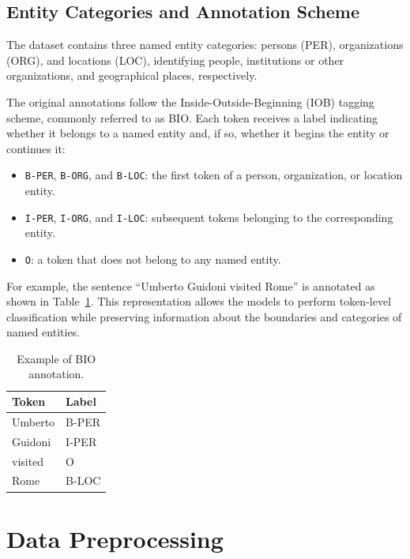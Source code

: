 \subsection{Entity Categories and Annotation Scheme}
\label{subsec:ent-cat}

The dataset contains three named entity categories: persons (PER), organizations (ORG), and locations (LOC), identifying people, institutions or other organizations, and geographical places, respectively.

The original annotations follow the Inside-Outside-Beginning (IOB) tagging scheme, commonly referred to as BIO. Each token receives a label indicating whether it belongs to a named entity and, if so, whether it begins the entity or continues it:

\begin{itemize}
\item \texttt{B-PER}, \texttt{B-ORG}, and \texttt{B-LOC}: the first token of a person, organization, or location entity.
\item \texttt{I-PER}, \texttt{I-ORG}, and \texttt{I-LOC}: subsequent tokens belonging to the corresponding entity.
\item \texttt{O}: a token that does not belong to any named entity.
\end{itemize}

For example, the sentence ``Umberto Guidoni visited Rome'' is annotated as shown in Table~\ref{tab:bio-example}. This representation allows the models to perform token-level classification while preserving information about the boundaries and categories of named entities.

\begin{table}[H]
    \centering
    \caption{Example of BIO annotation.}
    \label{tab:bio-example}
    \begin{tabular}{ll}
        \hline
        \textbf{Token} & \textbf{Label} \\
        \hline
        Umberto & B-PER \\
        Guidoni & I-PER \\
        visited & O \\
        Rome & B-LOC \\
        \hline
    \end{tabular}
\end{table}

\section{Data Preprocessing}
\label{sec:preprocessing}

